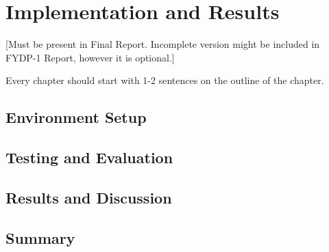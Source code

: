 \chapter{Implementation and Results}

[Must be present in Final Report. Incomplete version might be included in FYDP-1 Report, however it is optional.]

Every chapter should start with 1-2 sentences on the outline of the chapter.

\section{Environment Setup}
\section{Testing and Evaluation}
\section{Results and Discussion}
\section{Summary}